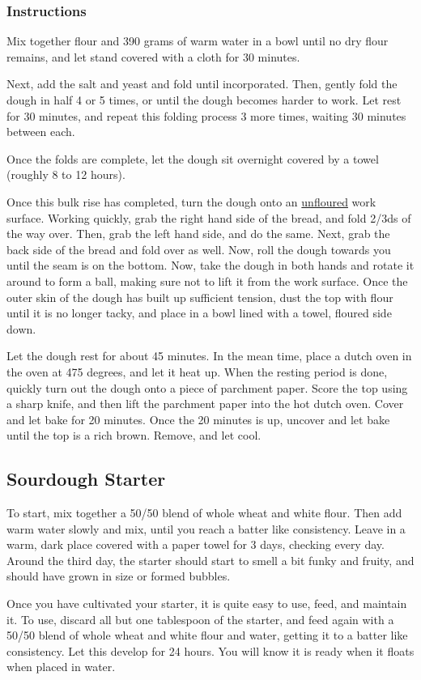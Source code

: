 \documentclass[11pt]{article}
\begin{document}
\subsubsection{Instructions}
\label{sec:orga19094e}
Mix together flour and 390 grams of warm water in a bowl until no
dry flour remains, and let stand covered with a cloth for 30 minutes.

Next, add the salt and yeast and fold until incorporated. Then,
gently fold the dough in half 4 or 5 times, or until the dough
becomes harder to work. Let rest for 30 minutes, and repeat this
folding process 3 more times, waiting 30 minutes between each.

Once the folds are complete, let the dough sit overnight covered
by a towel (roughly 8 to 12 hours).

Once this bulk rise has completed, turn the dough onto an
\uline{unfloured} work surface. Working quickly, grab the right hand
side of the bread, and fold 2/3ds of the way over. Then, grab the
left hand side, and do the same. Next, grab the back side of the
bread and fold over as well. Now, roll the dough towards you until
the seam is on the bottom. Now, take the dough in both hands and
rotate it around to form a ball, making sure not to lift it from
the work surface. Once the outer skin of the dough has built up
sufficient tension, dust the top with flour until it is no longer
tacky, and place in a bowl lined with a towel, floured side down.

Let the dough rest for about 45 minutes. In the mean time, place a
dutch oven in the oven at 475 degrees, and let it heat up. When
the resting period is done, quickly turn out the dough onto a
piece of parchment paper. Score the top using a sharp knife, and
then lift the parchment paper into the hot dutch oven. Cover and
let bake for 20 minutes. Once the 20 minutes is up, uncover and
let bake until the top is a rich brown. Remove, and let cool.
\subsection{Sourdough Starter}
\label{sec:org3e6f48c}
To start, mix together a 50/50 blend of whole wheat and white
flour. Then add warm water slowly and mix, until you reach a batter
like consistency. Leave in a warm, dark place covered with a paper towel
for 3 days, checking every day. Around the third day, the starter
should start to smell a bit funky and fruity, and should have grown
in size or formed bubbles.

Once you have cultivated your starter, it is quite easy to use,
feed, and maintain it. To use, discard all but one tablespoon of
the starter, and feed again with a 50/50 blend of whole wheat and
white flour and water, getting it to a batter like consistency.
Let this develop for 24 hours. You will know it is ready when it
floats when placed in water.
\end{document}
